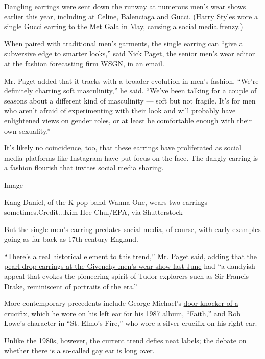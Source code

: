 Dangling earrings were sent down the runway at numerous men's wear shows
earlier this year, including at Celine, Balenciaga and Gucci. (Harry
Styles wore a single Gucci earring to the Met Gala in May, causing a
\href{https://www.wmagazine.com/story/harry-style-met-gala-2019-memes}{social
media frenzy.)}

When paired with traditional men's garments, the single earring can
``give a subversive edge to smarter looks,'' said Nick Paget, the senior
men's wear editor at the fashion forecasting firm WSGN, in an email.

Mr. Paget added that it tracks with a broader evolution in men's
fashion. ``We're definitely charting soft masculinity,'' he said.
``We've been talking for a couple of seasons about a different kind of
masculinity --- soft but not fragile. It's for men who aren't afraid of
experimenting with their look and will probably have enlightened views
on gender roles, or at least be comfortable enough with their own
sexuality.''

It's likely no coincidence, too, that these earrings have proliferated
as social media platforms like Instagram have put focus on the face. The
dangly earring is a fashion flourish that invites social media sharing.

Image

Kang Daniel, of the K-pop band Wanna One, wears two earrings
sometimes.Credit...Kim Hee-Chul/EPA, via Shutterstock

But the single men's earring predates social media, of course, with
early examples going as far back as 17th-century England.

``There's a real historical element to this trend,'' Mr. Paget said,
adding that the
\href{https://www.nytimes.com/slideshow/2019/06/12/fashion/runway-mens/givenchy-spring-2020/s/Givenchy-spring-2020-mens-slide-XJBS.html}{pearl
drop earrings at the Givenchy men's wear show last June} had ``a
dandyish appeal that evokes the pioneering spirit of Tudor explorers
such as Sir Francis Drake, reminiscent of portraits of the era.''

More contemporary precedents include George Michael's
\href{https://www.gq.com/story/dangly-earrings-rule}{door knocker of a
crucifix}, which he wore on his left ear for his 1987 album, ``Faith,''
and Rob Lowe's character in ``St. Elmo's Fire,'' who wore a silver
crucifix on his right ear.

Unlike the 1980s, however, the current trend defies neat labels; the
debate on whether there is a so-called gay ear is long over.

